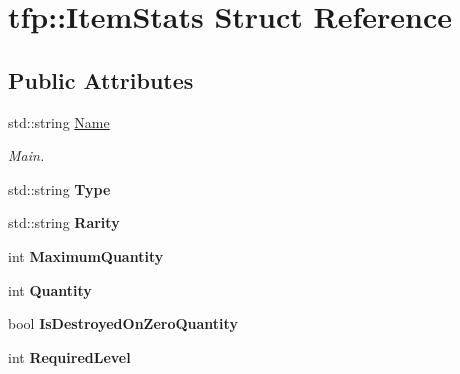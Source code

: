 \hypertarget{structtfp_1_1_item_stats}{}\section{tfp\+:\+:Item\+Stats Struct Reference}
\label{structtfp_1_1_item_stats}
\subsection*{Public Attributes}
\begin{DoxyCompactItemize}
\item 
\mbox{\label{structtfp_1_1_item_stats_ad1a85920d15c5dddca71acdf2222a0eb}} 
std\+::string \mbox{\hyperlink{structtfp_1_1_item_stats_ad1a85920d15c5dddca71acdf2222a0eb}{Name}}
\begin{DoxyCompactList}\small\item\em Main. \end{DoxyCompactList}\item 
\mbox{\label{structtfp_1_1_item_stats_a39422a1c85cbb6bd77c05d6693697c92}} 
std\+::string {\bfseries Type}
\item 
\mbox{\label{structtfp_1_1_item_stats_a0bca48949c0404329cedd8ac58ee85fa}} 
std\+::string {\bfseries Rarity}
\item 
\mbox{\label{structtfp_1_1_item_stats_a704db0978784bb1bbb5da74d48381ca8}} 
int {\bfseries Maximum\+Quantity}
\item 
\mbox{\label{structtfp_1_1_item_stats_a5ede1e90ad72d117b049888399aa1d6b}} 
int {\bfseries Quantity}
\item 
\mbox{\label{structtfp_1_1_item_stats_a1870001bed06b7e34b8933bc4ece3853}} 
bool {\bfseries Is\+Destroyed\+On\+Zero\+Quantity}
\item 
\mbox{\label{structtfp_1_1_item_stats_a0d8cb06ae7e776909350199fe1b712c5}} 
int {\bfseries Required\+Level}
\item 
\mbox{\label{structtfp_1_1_item_stats_aaec59347b65dc7d7c1ec44c695381a57}} 

\end{DoxyCompactItemize}
